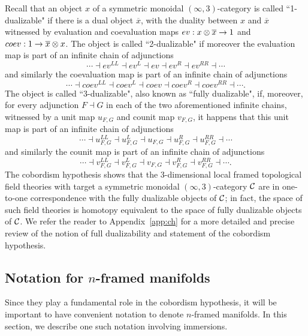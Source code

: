 \documentclass{amsart}
\begin{document}
Recall that an object $x$ of a symmetric monoidal $(\infty,3)$-category is called ``1-dualizable" if there is a dual object $\overline{x}$, with the duality between $x$ and $\overline{x}$ witnessed by evaluation and coevaluation maps $ev: x \otimes \overline{x} \rightarrow 1$ and $coev: 1 \rightarrow \overline{x} \otimes x$.  The object is called ``2-dualizable" if moreover the evaluation map is part of an infinite chain of adjunctions 
$$\cdots \dashv ev^{LL} \dashv ev^L \dashv ev \dashv ev^R \dashv ev^{RR} \dashv \cdots$$
and similarly the coevaluation map is part of an infinite chain of adjunctions 
$$\cdots \dashv coev^{LL} \dashv coev^L \dashv coev \dashv coev^R \dashv coev^{RR} \dashv \cdots.$$  
The object is called ``3-dualizable", also known as ``fully dualizable", if, moreover, for every adjunction $F \dashv G$ in each of the two aforementioned infinite chains, witnessed by a unit map $u_{F,G}$ and counit map $v_{F,G}$, it happens that this unit map is part of an infinite chain of adjunctions 
$$\cdots \dashv u_{F,G}^{LL} \dashv u_{F,G}^L \dashv u_{F,G} \dashv u_{F,G}^R \dashv u_{F,G}^{RR} \dashv \cdots$$ 
and similarly the counit map is part of an infinite chain of adjunctions 
$$\cdots \dashv v_{F,G}^{LL} \dashv v_{F,G}^L \dashv v_{F,G} \dashv v_{F,G}^R \dashv v_{F,G}^{RR} \dashv \cdots.$$  
The cobordism hypothesis shows that the 3-dimensional local framed topological field theories with target a symmetric monoidal $(\infty,3)$-category $\mathcal C$ are in one-to-one correspondence with the fully dualizable objects of $\mathcal C$; in fact, the space of such field theories is homotopy equivalent to the space of fully dualizable objects of $\mathcal C$.  We refer the reader to Appendix~\ref{app:ch} for a more detailed and precise review of the notion of full dualizability and statement of the cobordism hypothesis. 

\subsection{Notation for $n$-framed manifolds} 

Since they play a fundamental role in the cobordism hypothesis, it will be important to have convenient notation to denote $n$-framed manifolds.  In this section, we describe one such notation involving immersions.
\end{document}
